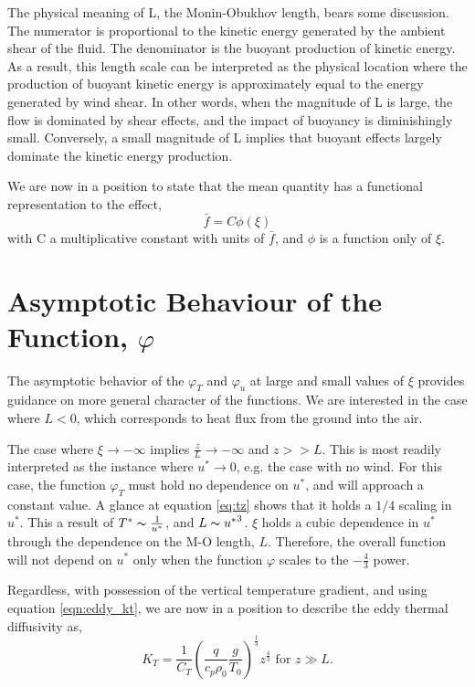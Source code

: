 The physical meaning of L, the Monin-Obukhov length, bears some discussion. 
The numerator is proportional to the kinetic energy generated by the ambient 
shear of the fluid. The denominator is the buoyant production of kinetic energy. 
As a result, this length scale can be interpreted as the physical location where the
production of buoyant kinetic energy is approximately equal to the energy generated 
by wind shear. In other words, when the magnitude of L is large, the flow is dominated
by shear effects, and the impact of buoyancy is diminishingly small. Conversely, a small 
magnitude of L implies that buoyant effects largely dominate the kinetic energy production.

We are now in a position to state that the mean quantity has a
functional representation to the effect,
\begin{equation}
 \bar f = C \phi(\xi)
\end{equation}
with C a multiplicative constant with units of $\bar f$, and $\phi$ is a
function only of $\xi$. 

\section*{Asymptotic Behaviour of the Function, $\varphi$}

The asymptotic behavior of the $\varphi_T$ and $\varphi_u$ at
large and small values of $\xi$ provides guidance on more general character of the
functions. We are interested in the case where $L<0$, which corresponds to 
heat flux from the ground into the air.  

The case where $\xi \to -\infty $ implies $\frac{z}{L} \to
-\infty $ and $z>>L$. This is most readily interpreted as the instance
where $u^* \to 0$, e.g. the case with no wind. For this case, the
function $\varphi_T$ must hold no dependence on $u^*$, and will approach
a constant value. A glance at
equation \ref{eq:tz} shows that it holds a $1/4$ scaling in $u^*$. This
a result of $T^* \thicksim \frac{1}{u^*}$, and $L \thicksim
{u^*}^3$. $\xi$ holds a cubic dependence in $u^*$ through the dependence
on the M-O length, $L$. Therefore, the overall function will not depend
on $u^*$ only when the function $\varphi$ scales to the
$-\frac{4}{3}$ power. 

Regardless, with possession of the vertical temperature gradient, and
using equation \ref{eqn:eddy_kt},  
we are now in a position to describe the eddy thermal diffusivity as, 
\begin{equation}
 K_T = \frac{1}{C_T} \left( \frac{q}{c_p \rho_0} \frac{g}{T_0}
		     \right)^\frac{1}{3} z^{\frac{4}{3}}  \text{ 
for } z \gg L. 
\end{equation}

